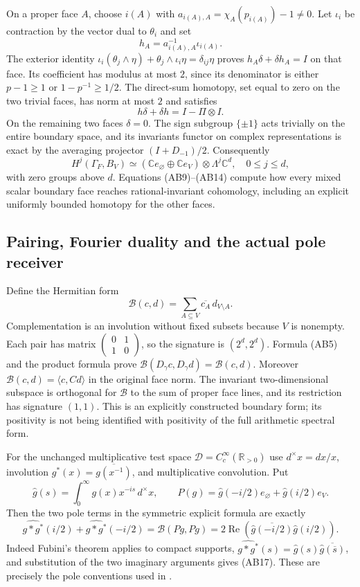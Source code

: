 \documentclass[11pt,a4paper]{article}
\theoremstyle{definition}\newtheorem{definition}[theorem]{Definition}
\newcommand{\C}{\mathbb C}\newcommand{\R}{\mathbb R}
\begin{document}
On a proper face $A$, choose $i(A)$ with
$a_{i(A),A}=\chi_A(p_{i(A)})-1\ne0$. Let $\iota_i$ be contraction by
the vector dual to $\theta_i$ and set
\[
 h_A=a_{i(A),A}^{-1}\iota_{i(A)}.
 \tag{AB12}
\]
The exterior identity
$\iota_i(\theta_j\wedge\eta)+\theta_j\wedge\iota_i\eta
=\delta_{ij}\eta$ proves $h_A\delta+\delta h_A=I$ on that face.
Its coefficient has modulus at most $2$, since its denominator is either
$p-1\ge1$ or $1-p^{-1}\ge1/2$. The direct-sum homotopy, set equal to zero
on the two trivial faces, has norm at most $2$ and satisfies
\[
 h\delta+\delta h=I-\Pi\otimes I.
 \tag{AB13}
\]
On the remaining two faces $\delta=0$. The sign subgroup $\{\pm1\}$
acts trivially on the entire boundary space, and its invariants functor on
complex representations is exact by the averaging projector
$(I+D_{-1})/2$. Consequently
\[
 H^j(\Gamma_F,B_V)
 \simeq (\C e_\varnothing\oplus\C e_V)\otimes\Lambda^j\C^d,
 \quad 0\le j\le d,
 \tag{AB14}
\]
with zero groups above $d$. Equations (AB9)--(AB14) compute how every
mixed scalar boundary face reaches rational-invariant cohomology, including
an explicit uniformly bounded homotopy for the other faces.

\subsection{Pairing, Fourier duality and the actual pole receiver}
Define the Hermitian form
\[
 \mathscr B(c,d)=\sum_{A\subseteq V}\overline{c_A}\,d_{V\setminus A}.
 \tag{AB15}
\]
Complementation is an involution without fixed subsets because $V$ is
nonempty. Each pair has matrix $\left(\begin{smallmatrix}0&1\\1&0\end{smallmatrix}\right)$,
so the signature is $(2^d,2^d)$. Formula (AB5) and the product formula prove
$\mathscr B(D_\gamma c,D_\gamma d)=\mathscr B(c,d)$.
Moreover $\mathscr B(c,d)=\langle c,Cd\rangle$ in the original face norm.
The invariant two-dimensional subspace is orthogonal for $\mathscr B$ to
the sum of proper face lines, and its restriction has signature $(1,1)$.
This is an explicitly constructed boundary form; its positivity is not
being identified with positivity of the full arithmetic spectral form.

For the unchanged multiplicative test space $\mathcal D=C_c^\infty(\R_{>0})$
use $d^\times x=dx/x$, involution $g^*(x)=\overline{g(x^{-1})}$,
and multiplicative convolution. Put
\[
 \widehat g(s)=\int_0^\infty g(x)x^{-is}\,d^\times x,
 \qquad P(g)=\widehat g(-i/2)e_\varnothing+\widehat g(i/2)e_V.
 \tag{AB16}
\]
Then the two pole terms in the symmetric explicit formula are exactly
\[
 \widehat{g*g^*}(i/2)+\widehat{g*g^*}(-i/2)
 =\mathscr B(Pg,Pg)
 =2\operatorname{Re}\left(\overline{\widehat g(-i/2)}
                              \widehat g(i/2)\right).
 \tag{AB17}
\]
Indeed Fubini's theorem applies to compact supports,
$\widehat{g*g^*}(s)=\widehat g(s)\overline{\widehat g(\overline s)}$,
and substitution of the two imaginary arguments gives (AB17).
These are precisely the pole conventions used in
\cite[\texttt{sectweilpos}, \texttt{wp}]{Connes2026}.
\end{document}
